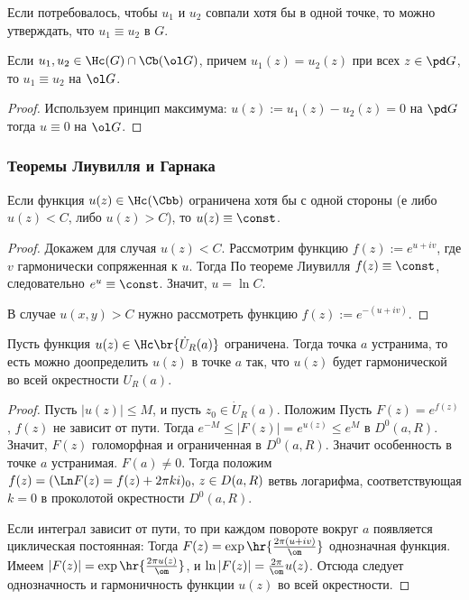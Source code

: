 \documentclass[a4paper]{article}
\begin{document}
\begin{theorem}
Если потребовалось, чтобы $u_1$ и $u_2$ совпали хотя бы в одной точке,
  то можно утверждать, что $u_1\equiv u_2$ в $G$.

\begin{theorem}[3]
Если $u_1,u_2\in\Hc(G)\cap \Cb(\ol G)$, причем $u_1(z)=u_2(z)$ при всех $z\in \pd G$, то $u_1\equiv u_2$ на $\ol G$.
\end{theorem}
\begin{proof}
Используем принцип максимума: $u(z):=u_1(z)-u_2(z)=0$ на $\pd G$ тогда $u\equiv 0$ на
$\ol G$.
\end{proof}

\subsubsection{Теоремы Лиувилля и Гарнака}

\begin{theorem}[Лиувилль]
Если функция $u(z)\in\Hc(\Cbb)$ ограничена хотя бы с одной стороны (е либо $u(z)<C$, либо $u(z)>C$),
то $u(z)\equiv\const$.
\end{theorem}
\begin{proof}
Докажем для случая $u(z)<C$. Рассмотрим функцию $f(z) :=e^{u+iv}$, где $v$ гармонически сопряженная к $u$. Тогда
По теореме Лиувилля $f(z)\equiv \const$, следовательно $e^u\equiv \const$. Значит, $u=\ln C$.

В случае $u(x,y)>C$ нужно рассмотреть функцию $f(z):=e^{-(u+iv)}$.
\end{proof}

\begin{theorem}[Гарнак]
Пусть функция $u(z)\in \Hc\br{\dot U_R(a)}$ ограничена. Тогда точка $a$ устранима,
то есть можно доопределить $u(z)$ в точке $a$ так, что $u(z)$ будет гармонической
во всей окрестности $U_R(a)$.
\end{theorem}
\begin{proof}
Пусть $|u(z)|\le M$, и пусть $z_0\in \dot U_R(a)$. Положим
Пусть $F(z)=e^{f(z)}$, $f(z)$ не зависит от пути.
Тогда $e^{-M}\le |F(z)|=e^{u(z)}\le e^M$ в $D^0(a,R)$.
Значит, $F(z)$ голоморфная и ограниченная в $D^0(a,R)$. Значит особенность в
точке $a$ устранимая. $F(a)\neq 0$. Тогда положим
$f(z)=(\Ln F(z)=f(z)+2\pi ki)_0, \, z\in D(a,R)$ ветвь логарифма,
соответствующая $k = 0$ в проколотой окрестности $D^0(a,R)$.

Если интеграл зависит от пути, то при каждом повороте вокруг $a$ появляется циклическая постоянная:
Тогда $F(z)=\exp\hr{\frac{2\pi(u+iv)}{\om}}$ однозначная функция. Имеем
$|F(z)|=\exp\hr{\frac{2\pi u(z)}{\om}}$, и $\ln |F(z)|=\frac{2\pi}{\om}u(z)$.
Отсюда следует однозначность и гармоничность функции $u(z)$ во всей окрестности.
\end{proof}


\end{theorem}
\end{document}

